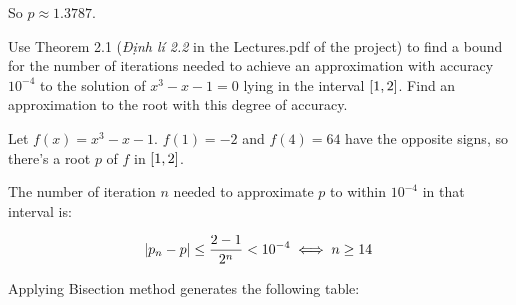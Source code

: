 \documentclass[../../../../Assignments.tex]{subfiles}
\begin{document}
\begin{solution}
    So \(p \approx \num{1.3787}\).
\end{solution}

\begin{exercise}
    Use Theorem 2.1 (\emph{Định lí 2.2} in the Lectures.pdf of the project) to
    find a bound for the number of iterations needed to achieve an approximation
    with accuracy \(10^{-4}\) to the solution of \(x^3 - x - 1 = 0\) lying in
    the interval \(\interval{1}{2}\). Find an approximation to the root with
    this degree of accuracy.
\end{exercise}

\begin{solution}
    Let \(f(x) = x^3 - x - 1\). \(f(1) = -2\) and \(f(4) = 64\) have the
    opposite signs, so there's a root \(p\) of \(f\) in \(\interval{1}{2}\).

    The number of iteration \(n\) needed to approximate \(p\) to within
    \(10^{-4}\) in that interval is:

    \[\abs{p_n - p} \leq \frac{2 - 1}{2^n} < 10^{-4} \iff n \geq 14\]

    Applying Bisection method generates the following table:


\end{solution}
\end{document}
